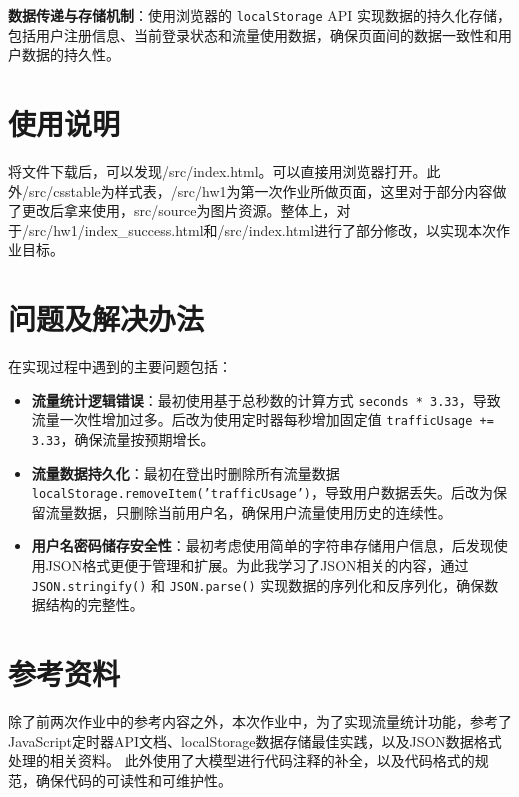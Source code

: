 \documentclass[UTF8]{ctexart}
\begin{document}
\textbf{数据传递与存储机制}：使用浏览器的 \texttt{localStorage} API 实现数据的持久化存储，包括用户注册信息、当前登录状态和流量使用数据，确保页面间的数据一致性和用户数据的持久性。

\section{使用说明}

将文件下载后，可以发现/src/index.html。可以直接用浏览器打开。此外/src/csstable为样式表，/src/hw1为第一次作业所做页面，这里对于部分内容做了更改后拿来使用，src/source为图片资源。整体上，对于/src/hw1/index\_success.html和/src/index.html进行了部分修改，以实现本次作业目标。

\section{问题及解决办法}

在实现过程中遇到的主要问题包括：

\begin{itemize}
    \item \textbf{流量统计逻辑错误}：最初使用基于总秒数的计算方式 \texttt{seconds * 3.33}，导致流量一次性增加过多。后改为使用定时器每秒增加固定值 \texttt{trafficUsage += 3.33}，确保流量按预期增长。
    
    \item \textbf{流量数据持久化}：最初在登出时删除所有流量数据 \texttt{localStorage.removeItem('trafficUsage')}，导致用户数据丢失。后改为保留流量数据，只删除当前用户名，确保用户流量使用历史的连续性。
            
    \item \textbf{用户名密码储存安全性}：最初考虑使用简单的字符串存储用户信息，后发现使用JSON格式更便于管理和扩展。为此我学习了JSON相关的内容，通过 \texttt{JSON.stringify()} 和 \texttt{JSON.parse()} 实现数据的序列化和反序列化，确保数据结构的完整性。
\end{itemize}

\section{参考资料}

除了前两次作业中的参考内容之外，本次作业中，为了实现流量统计功能，参考了JavaScript定时器API文档、localStorage数据存储最佳实践，以及JSON数据格式处理的相关资料。
此外使用了大模型进行代码注释的补全，以及代码格式的规范，确保代码的可读性和可维护性。
\end{document}
